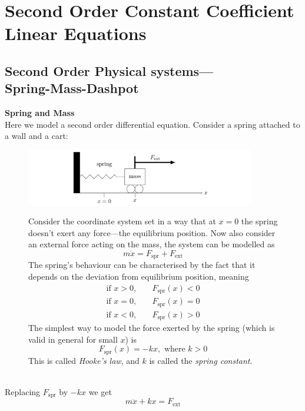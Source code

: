 \documentclass{report}
\begin{document}
\newpage

\section{Second Order Constant Coefficient Linear Equations}
\subsection{Second Order Physical systems---\\Spring-Mass-Dashpot}
\textbf{Spring and Mass}\\
Here we model a second order differential equation. Consider a spring attached to a wall and a cart:
\begin{figure}[h]
\begin{center}
\includegraphics[width=10cm]{21}\\
\end{center}
Consider the coordinate system set in a way that at $x=0$ the spring doesn't exert any force---the equilibrium 
position. Now also consider an external force acting on the mass, the system can be modelled as
\begin{equation*}
m\ddot{x}=F_\text{spr}+F_\text{ext}
\end{equation*}
The spring's behaviour can be characterised by the fact that it depends on the deviation from equilibrium position,
meaning
\begin{align*}
\text{if }x>0,\quad&F_\text{spr}(x)<0\\
\text{if }x=0,\quad&F_\text{spr}(x)=0\\
\text{if }x<0,\quad&F_\text{spr}(x)>0
\end{align*}
The simplest way to model the force exerted by the spring (which is valid in general for small $x$) is
\begin{equation*}
F_\text{spr}(x)=-kx,\text{ where }k>0
\end{equation*}
This is called \textit{Hooke's law}, and $k$ is called the \textit{spring constant}.
\end{figure}\\
Replacing $F_\text{spr}$ by $-kx$ we get
\begin{equation*}
m\ddot{x}+kx=F_\text{ext}
\end{equation*}
\end{document}
